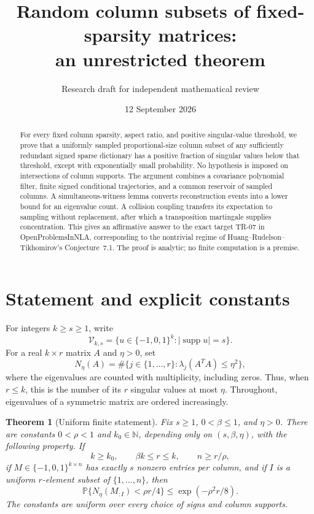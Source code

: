 \documentclass[11pt,a4paper]{article}
\title{Random column subsets of fixed-sparsity matrices:\\an unrestricted theorem}
\author{Research draft for independent mathematical review}
\date{12 September 2026}
\newtheorem{theorem}{Theorem}[section]
\theoremstyle{remark}\newtheorem{remark}[theorem]{Remark}
\newcommand{\Prob}{\mathbb P}
\newcommand{\supp}{\operatorname{supp}}
\begin{document}
\maketitle
\begin{abstract}
For every fixed column sparsity, aspect ratio, and positive singular-value threshold, we prove that a uniformly sampled proportional-size column subset of any sufficiently redundant signed sparse dictionary has a positive fraction of singular values below that threshold, except with exponentially small probability. No hypothesis is imposed on intersections of column supports. The argument combines a covariance polynomial filter, finite signed conditional trajectories, and a common reservoir of sampled columns. A simultaneous-witness lemma converts reconstruction events into a lower bound for an eigenvalue count. A collision coupling transfers its expectation to sampling without replacement, after which a transposition martingale supplies concentration. This gives an affirmative answer to the exact target TR-07 in OpenProblemsInNLA, corresponding to the nontrivial regime of Huang--Rudelson--Tikhomirov's Conjecture~7.1. The proof is analytic; no finite computation is a premise.
\end{abstract}

\section{Statement and explicit constants}
For integers $k\ge s\ge1$, write
\[
 \mathcal V_{k,s}=\{u\in\{-1,0,1\}^k:|\supp u|=s\}.
\]
For a real $k\times r$ matrix $A$ and $\eta>0$, set
\[
 N_\eta(A)=\#\{j\in\{1,\ldots,r\}:\lambda_j(A^TA)\le\eta^2\},
\]
where the eigenvalues are counted with multiplicity, including zeros. Thus, when $r\le k$, this is the number of its $r$ singular values at most $\eta$. Throughout, eigenvalues of a symmetric matrix are ordered increasingly.

\begin{theorem}[Uniform finite statement]\label{thm:finite}
Fix $s\ge1$, $0<\beta\le1$, and $\eta>0$. There are constants $0<\rho<1$ and $k_0\in\mathbb N$, depending only on $(s,\beta,\eta)$, with the following property. If
\[
 k\ge k_0,\qquad \beta k\le r\le k,\qquad n\ge r/\rho,
\]
if $M\in\{-1,0,1\}^{k\times n}$ has exactly $s$ nonzero entries per column, and if $I$ is a uniform $r$-element subset of $\{1,\ldots,n\}$, then
\begin{equation}\label{eq:main}
 \Prob\{N_\eta(M_{:I})<\rho r/4\}
 \le \exp(-\rho^2r/8).
\end{equation}
The constants are uniform over every choice of signs and column supports.
\end{theorem}
\end{document}
